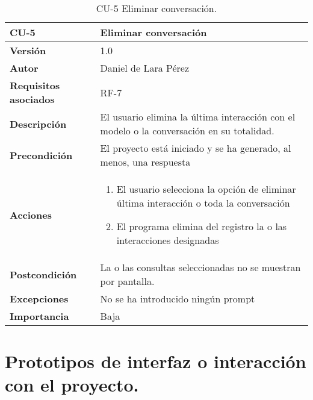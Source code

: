 \begin{table}[p]
	\centering
	\begin{tabularx}{\linewidth}{ p{} p{} }
		\toprule
		\textbf{CU-5}    & \textbf{Eliminar conversación}\\
		\toprule
		\textbf{Versión}              & 1.0    \\
		\textbf{Autor}                & Daniel de Lara Pérez \\
		\textbf{Requisitos asociados} & RF-7 \\
		\textbf{Descripción}          & El usuario elimina la última interacción con el modelo o la conversación en su totalidad. \\
		\textbf{Precondición}         & El proyecto está iniciado y se ha generado, al menos, una respuesta \\
		\textbf{Acciones}             &
		\begin{enumerate}
			\def\labelenumi{\arabic{enumi}.}
			\tightlist
			\item El usuario selecciona la opción de eliminar última interacción o toda la conversación
            \item El programa elimina del registro la o las interacciones designadas
         
		\end{enumerate}\\
		\textbf{Postcondición}        & La o las consultas seleccionadas no se muestran por pantalla. \\
		\textbf{Excepciones}          &  No se ha introducido ningún prompt \\
		\textbf{Importancia}          & Baja\\
		\bottomrule
	\end{tabularx}
	\caption{CU-5 Eliminar conversación.}
\end{table}

\section{Prototipos de interfaz o interacción con el proyecto.}

